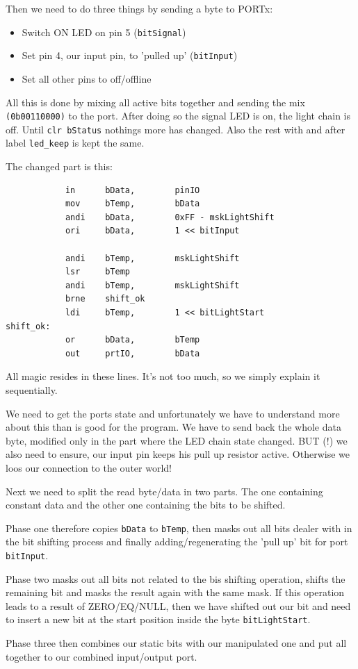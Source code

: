 Then we need to do three things by sending a byte to PORTx:

\begin{itemize}
  \item Switch ON LED on pin 5 (\texttt{bitSignal})
  \item Set pin 4, our input pin, to 'pulled up' (\texttt{bitInput})
  \item Set all other pins to off/offline
\end{itemize}

All this is done by mixing all active bits together and sending the mix \texttt{(0b00110000)} to the port. After doing so the signal LED is on, the light chain is off. Until \texttt{clr bStatus} nothings more has changed. Also the rest with and after label \texttt{led\_keep} is kept the same.

The changed part is this:

\begin{lstlisting}
            in      bData,        pinIO
            mov     bTemp,        bData
            andi    bData,        0xFF - mskLightShift
            ori     bData,        1 << bitInput

            andi    bTemp,        mskLightShift
            lsr     bTemp
            andi    bTemp,        mskLightShift
            brne    shift_ok
            ldi     bTemp,        1 << bitLightStart
shift_ok:
            or      bData,        bTemp
            out     prtIO,        bData
\end{lstlisting}

All magic resides in these lines. It's not too much, so we simply explain it sequentially.

We need to get the ports state and unfortunately we have to understand more about this than is good for the program. We have to send back the whole data byte, modified only in the part where the LED chain state changed. BUT (!) we also need to ensure, our input pin keeps his pull up resistor active. Otherwise we loos our connection to the outer world!

Next we need to split the read byte/data in two parts. The one containing constant data and the other one containing the bits to be shifted.

Phase one therefore copies \texttt{bData} to \texttt{bTemp}, then masks out all bits dealer with in the bit shifting process and finally adding/regenerating the 'pull up' bit for port \texttt{bitInput}.

Phase two masks out all bits not related to the bis shifting operation, shifts the remaining bit and masks the result again with the same mask. If this operation leads to a result of ZERO/EQ/NULL, then we have shifted out our bit and need to insert a new bit at the start position inside the byte \texttt{bitLightStart}.

Phase three then combines our static bits with our manipulated one and put all together to our combined input/output port.
